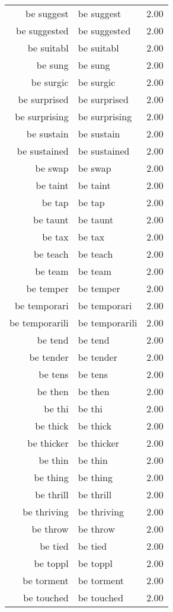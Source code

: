 \begin{table}[ht]
\begin{tabular}{rlr}
  be suggest & be suggest & 2.00 \\ 
  be suggested & be suggested & 2.00 \\ 
  be suitabl & be suitabl & 2.00 \\ 
  be sung & be sung & 2.00 \\ 
  be surgic & be surgic & 2.00 \\ 
  be surprised & be surprised & 2.00 \\ 
  be surprising & be surprising & 2.00 \\ 
  be sustain & be sustain & 2.00 \\ 
  be sustained & be sustained & 2.00 \\ 
  be swap & be swap & 2.00 \\ 
  be taint & be taint & 2.00 \\ 
  be tap & be tap & 2.00 \\ 
  be taunt & be taunt & 2.00 \\ 
  be tax & be tax & 2.00 \\ 
  be teach & be teach & 2.00 \\ 
  be team & be team & 2.00 \\ 
  be temper & be temper & 2.00 \\ 
  be temporari & be temporari & 2.00 \\ 
  be temporarili & be temporarili & 2.00 \\ 
  be tend & be tend & 2.00 \\ 
  be tender & be tender & 2.00 \\ 
  be tens & be tens & 2.00 \\ 
  be then & be then & 2.00 \\ 
  be thi & be thi & 2.00 \\ 
  be thick & be thick & 2.00 \\ 
  be thicker & be thicker & 2.00 \\ 
  be thin & be thin & 2.00 \\ 
  be thing & be thing & 2.00 \\ 
  be thrill & be thrill & 2.00 \\ 
  be thriving & be thriving & 2.00 \\ 
  be throw & be throw & 2.00 \\ 
  be tied & be tied & 2.00 \\ 
  be toppl & be toppl & 2.00 \\ 
  be torment & be torment & 2.00 \\ 
  be touched & be touched & 2.00 \\ 

\end{tabular}
\end{table}
